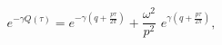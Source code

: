 \begin{equation}\label{g-solution}
e^{-\gamma Q(\tau)}=
e^{-\gamma \left(q+\frac{p\tau}{2\pi}\right)} +
\frac{\omega^2}{p^2}\,\,e^{\gamma \left(q+\frac{p\tau}{2\pi}\right)},
\end{equation}

